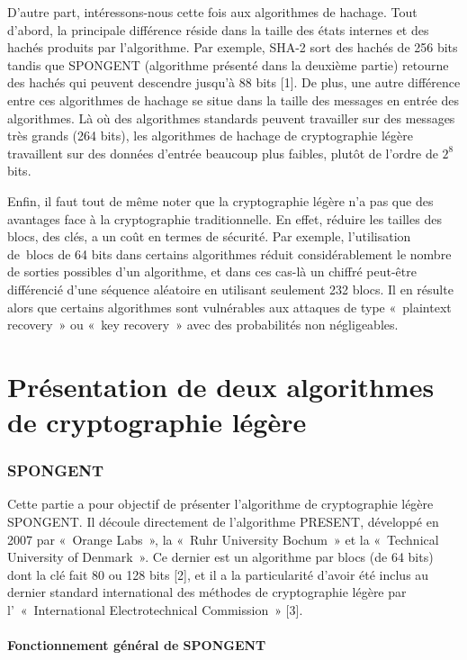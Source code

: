 	D’autre part, intéressons-nous cette fois aux algorithmes de hachage.
	Tout d’abord, la principale différence réside dans la taille des états internes et des hachés produits par l’algorithme.
	Par exemple, SHA-2 sort des hachés de 256 bits tandis que SPONGENT (algorithme présenté dans la deuxième partie) retourne des hachés qui peuvent descendre jusqu’à 88 bits [1].
	De plus, une autre différence entre ces algorithmes de hachage se situe dans la taille des messages en entrée des algorithmes.
	Là où des algorithmes standards peuvent travailler sur des messages très grands (264 bits), les algorithmes de hachage de cryptographie légère travaillent sur des données d’entrée beaucoup plus faibles, plutôt de l’ordre de $2^8$ bits.

	Enfin, il faut tout de même noter que la cryptographie légère n’a pas que des avantages face à la cryptographie traditionnelle.
	En effet, réduire les tailles des blocs, des clés, a un coût en termes de sécurité.
	Par exemple, l’utilisation de blocs de 64 bits dans certains algorithmes réduit considérablement le nombre de sorties possibles d’un algorithme,
	et dans ces cas-là un chiffré peut-être différencié d’une séquence aléatoire en utilisant seulement 232 blocs.
	Il en résulte alors que certains algorithmes sont vulnérables aux attaques de type « plaintext recovery » ou « key recovery » avec des probabilités non négligeables.


\part{Présentation de deux algorithmes de cryptographie légère}

	\section{SPONGENT}
	Cette partie a pour objectif de présenter l’algorithme de cryptographie légère SPONGENT.
	Il découle directement de l’algorithme PRESENT, développé en 2007 par « Orange Labs », la « Ruhr University Bochum » et la « Technical  University of Denmark ».
	Ce dernier est un algorithme par blocs (de 64 bits) dont la clé fait 80 ou 128 bits [2],
	et il a la particularité d’avoir été inclus au dernier standard international des méthodes de cryptographie légère par l’ « International Electrotechnical Commission » [3].

		\subsection{Fonctionnement général de SPONGENT}

